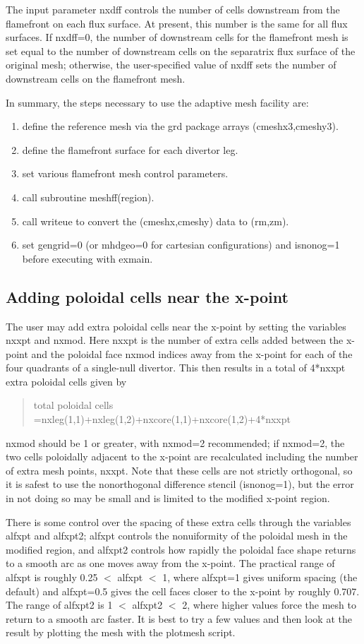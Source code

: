 \documentclass [12pt]{article}
\begin{document}
The input parameter nxdff controls the number of cells downstream from
the flamefront on each flux surface.  At present, this number is the
same for all flux surfaces.  If nxdff=0, the number of downstream
cells for the flamefront mesh is set equal to the number of downstream
cells on the separatrix flux surface of the original mesh; otherwise,
the user-specified value of nxdff sets the number of downstream cells
on the flamefront mesh.


In summary, the steps necessary to use the adaptive mesh facility are:
\begin{enumerate}
\item define the reference mesh via the grd package arrays (cmeshx3,cmeshy3).
\item define the flamefront surface for each divertor leg.
\item set various flamefront mesh control parameters.
\item call subroutine meshff(region). 
\item call writeue to convert the (cmeshx,cmeshy) data to (rm,zm).
\item set gengrid=0 (or mhdgeo=0 for cartesian configurations) and isnonog=1 
before executing with {\sf exmain}.
\end{enumerate}

\subsection{Adding poloidal cells near the x-point}

The user may add extra poloidal cells near the x-point by setting the
variables nxxpt and nxmod.  Here nxxpt is the number of extra cells added
between the x-point and the poloidal face nxmod indices away from the x-point
for each of the four quadrants of a single-null divertor.  This then results
in a total of 4*nxxpt extra poloidal cells given by
\begin{verse} \sf 
  total poloidal cells =nxleg(1,1)+nxleg(1,2)+nxcore(1,1)+nxcore(1,2)+4*nxxpt
\end{verse}
nxmod should be 1 or greater, with nxmod=2 recommended; if nxmod=2, the two
cells poloidally adjacent to the x-point are recalculated including the number
of extra mesh points, nxxpt.  Note that these cells are not strictly
orthogonal, so it is safest to use the nonorthogonal difference stencil
(isnonog=1), but the error in not doing so may be small and is limited to the
modified x-point region.

There is some control over the spacing of these extra cells through the
variables alfxpt and alfxpt2; alfxpt controls the nonuiformity of the poloidal
mesh in the modified region, and alfxpt2 controls how rapidly the poloidal
face shape returns to a smooth arc as one moves away from the x-point.  The
practical range of alfxpt is roughly 0.25 $<$ alfxpt $<$ 1, where alfxpt=1
gives uniform spacing (the default) and alfxpt=0.5 gives the cell faces closer
to the x-point by roughly 0.707. The range of alfxpt2 is 1 $<$ alfxpt2 $<$ 2,
where higher values force the mesh to return to a smooth arc faster. It is
best to try a few values and then look at the result by plotting the mesh with
the plotmesh script.
\end{document}
